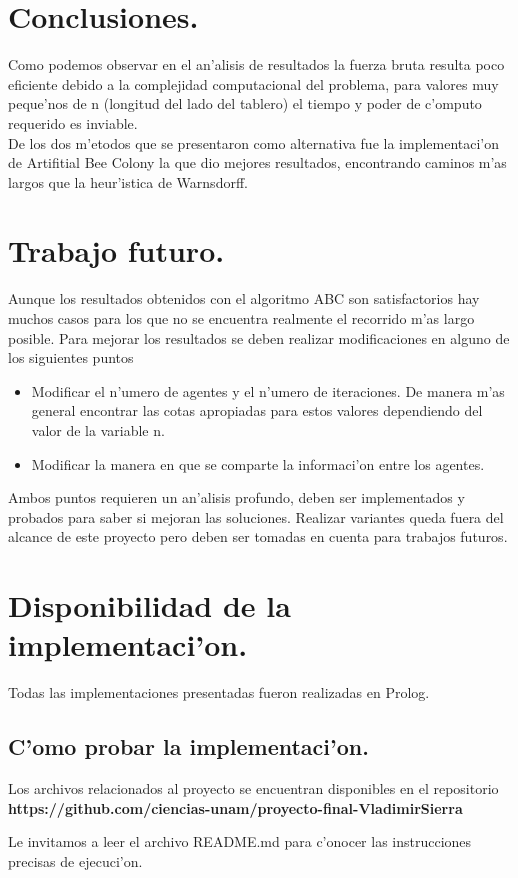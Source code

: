 \documentclass[12pt]{article}
\begin{document}
    \section{Conclusiones.}
    Como podemos observar en el an'alisis de resultados la fuerza bruta
    resulta poco eficiente debido a la complejidad computacional del problema,
    para valores muy peque'nos de n (longitud del lado del tablero)
    el tiempo y poder de c'omputo requerido es inviable. \\
    De los  dos m'etodos que se presentaron como alternativa
    fue la implementaci'on de Artifitial Bee Colony la que dio mejores resultados,
    encontrando caminos m'as largos que la heur'istica de Warnsdorff. \\


    \section{Trabajo futuro.}
    Aunque los resultados obtenidos con el algoritmo ABC son satisfactorios
    hay muchos casos para los que no se encuentra realmente el recorrido m'as largo posible.
    Para mejorar los resultados se deben realizar modificaciones en alguno de los siguientes puntos
    \begin{itemize}
        \item Modificar el n'umero de agentes y el n'umero de iteraciones. De manera m'as general
            encontrar las cotas apropiadas para estos
            valores dependiendo del valor de la variable n.
        \item Modificar la manera en que se comparte la informaci'on entre los agentes.
    \end{itemize}

    Ambos puntos requieren un an'alisis profundo, deben ser implementados y probados
    para saber si mejoran las soluciones.
    Realizar variantes queda fuera del alcance de este proyecto pero
    deben ser tomadas en cuenta para trabajos futuros.


    \section{Disponibilidad de la implementaci'on.}

    Todas las implementaciones presentadas fueron realizadas en Prolog.

    \subsection{C'omo probar la implementaci'on.}

    Los archivos relacionados al proyecto se encuentran disponibles
    en el repositorio\\
    \textbf{
    https://github.com/ciencias-unam/proyecto-final-VladimirSierra
    }

    Le invitamos a leer el archivo README.md para
    c'onocer las instrucciones precisas de ejecuci'on.


    \printbibliography
\end{document}
